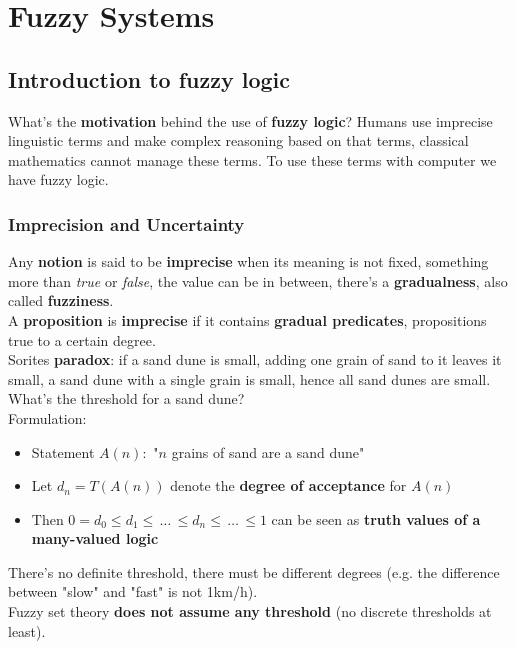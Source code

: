 \section{Fuzzy Systems}

\subsection{Introduction to fuzzy logic}

What's the \textbf{motivation} behind the use of \textbf{fuzzy logic}? Humans use imprecise linguistic terms and make complex reasoning based on that terms, classical mathematics cannot manage these terms. To use these terms with computer we have fuzzy logic.\\

\subsubsection{Imprecision and Uncertainty}

Any \textbf{notion} is said to be \textbf{imprecise} when its meaning is not fixed, something more than \textit{true} or \textit{false}, the value can be in between, there's a \textbf{gradualness}, also called \textbf{fuzziness}.\\

A \textbf{proposition} is \textbf{imprecise} if it contains \textbf{gradual predicates}, propositions true to a certain degree.\\

Sorites \textbf{paradox}: if a sand dune is small, adding one grain of sand to it leaves it small, a sand dune with a single grain is small, hence all sand dunes are small. What's the threshold for a sand dune?\\
Formulation:
\begin{itemize}
	\item Statement $A(n):$ "$n$ grains of sand are a sand dune"
	\item Let $d_n = T(A(n))$ denote the \textbf{degree of acceptance} for $A(n)$
	\item Then $0 = d_0 \leq d_1 \leq \, \dots \, \leq d_n \leq \, \dots \, \leq 1$ can be seen as \textbf{truth values of a many-valued logic} 
\end{itemize}
There's no definite threshold, there must be different degrees (e.g. the difference between "slow" and "fast" is not 1km/h).\\

Fuzzy set theory \textbf{does not assume any threshold} (no discrete thresholds at least).\\

